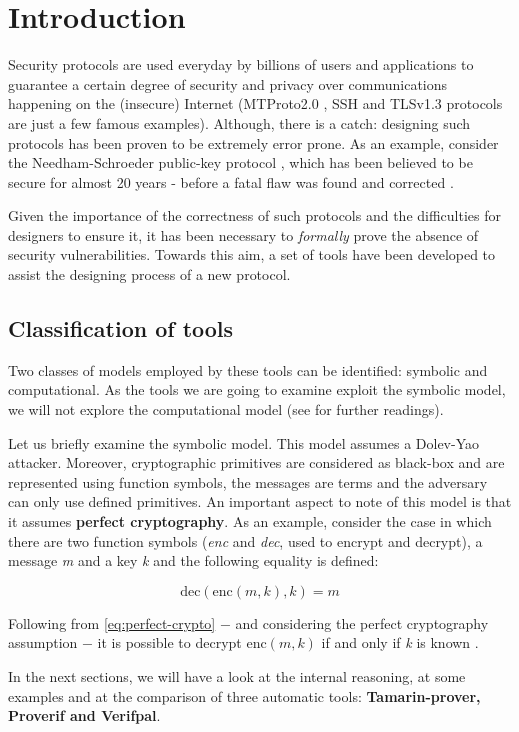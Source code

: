 
\section{Introduction}
\label{section:introduction}

Security protocols are used everyday by billions of users and applications to guarantee a certain degree of security and privacy over communications happening on the (insecure) Internet (MTProto2.0 \cite{Telegram-MTProto2.0}, SSH \cite{rfc4251} and TLSv1.3 \cite{TLSv1.3_specs} protocols are just a few famous examples). Although, there is a catch: designing such protocols has been proven to be extremely error prone. As an example, consider the Needham-Schroeder public-key protocol \cite{NSPK}, which has been believed to be secure for almost 20 years - before a fatal flaw was found and corrected \cite{NSPK_LoweGavin}.

Given the importance of the correctness of such protocols and the difficulties for designers to ensure it, it has been necessary to \textit{formally} prove the absence of security vulnerabilities. Towards this aim, a set of tools have been developed to assist the designing process of a new protocol.

\subsection{Classification of tools}

Two classes of models employed by these tools can be identified: symbolic and computational. As the tools we are going to examine exploit the symbolic model, we will not explore the computational model (see \cite{ReconcilingComputationalSymbolic, SymbolicComputationalBlanchet, 10.1007/978-3-540-31987-0_12} for further readings). 

Let us briefly examine the symbolic model. This model assumes a Dolev-Yao \cite{Dolev-Yao} attacker. Moreover, cryptographic primitives are considered as black-box and are represented using function symbols, the messages are terms and the adversary can only use defined primitives. An important aspect to note of this model is that it assumes \textbf{perfect cryptography}. As an example, consider the case in which there are two function symbols (\textit{enc} and \textit{dec}, used to encrypt and decrypt), a message \textit{m} and a key \textit{k} and the following equality is defined:

\begin{equation}
\label{eq:perfect-crypto}
    \mbox{dec}\left(\mbox{enc}\left(m, k\right), k\right) = m
\end{equation}

Following from \cref{eq:perfect-crypto} $-$ and considering the perfect cryptography assumption $-$ it is possible to decrypt $\mbox{enc}\left(m, k\right)$ if and only if \textit{k} is known \cite{SymbolicComputationalBlanchet}.

In the next sections, we will have a look at the internal reasoning, at some examples and at the comparison of three automatic tools: \textbf{Tamarin-prover, Proverif and Verifpal}.